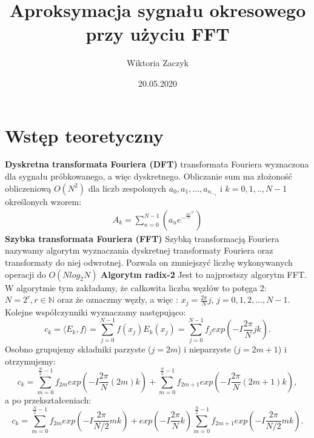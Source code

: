\documentclass{article}
\begin{document}
\title{Aproksymacja sygnału okresowego przy użyciu FFT}
\author{Wiktoria Zaczyk}
\date{20.05.2020}

\maketitle	

\section{Wstęp teoretyczny}
\textbf{Dyskretna transformata Fouriera (DFT)}
\newline
transformata Fouriera wyznaczona dla sygnału próbkowanego, a więc dyskretnego. Obliczanie sum ma złożoność obliczeniową $ O(N^2)$ dla liczb zespolonych $a_0,a_1,...,a_n_-_1$ i $k=0,1,..,N-1$ określonych wzorem:
\begin{equation}
\begin{array}{c}
A_k = \displaystyle \sum _{n=0}^{N-1}(a_ne^-^\frac{2\pi i}{N}^n^k) 
\end{array}
\end{equation}
\newline
\textbf{Szybka transformata Fouriera (FFT)}
\newline
Szybką transformacją Fouriera nazywamy algorytm wyznaczania dyskretnej transformaty Fouriera oraz transformaty do niej odwrotnej. Pozwala on zmniejszyć liczbę wykonywanych operacji do $O(N log_2N)$ 
\newline\newline
\textbf{Algorytm radix-2}
\newline
Jest to najprostszy algorytm FFT. W algorytmie tym zakładamy, że całkowita liczba węzłów to potęga 2: $N = 2^r, r \in \mathbb{N}$ oraz że oznaczmy węzły, a więc : $x_j = \frac{2\pi}{N} j$, $j = 0, 1, 2, . . . , N - 1$. Kolejne współczynniki wyznaczamy następująco:
\begin{equation}
c_k = \langle E_k, f \rangle = \displaystyle \sum_{j = 0}^{N-1} f(x_j)E_k(x_j) = \displaystyle \sum_{j = 0}^{N-1} f_j exp(-I\frac{2\pi}{N}jk).
\end{equation}
Osobno grupujemy składniki parzyste ($j= 2m$) i nieparzyste ($j = 2m+1$) i otrzymujemy:
\begin{equation}
c_k = \displaystyle \sum_{m = 0}^{\frac{N}{2}-1} f_{2m} exp(-I \frac{2\pi}{N}(2m)k) + \displaystyle \sum_{m = 0}^{\frac{N}{2}-1} f_{2m+1} exp(-I \frac{2\pi}{N}(2m+1)k),
\end{equation}
a po przekształceniach:
\begin{equation}
c_k = \displaystyle \sum_{m = 0}^{\frac{N}{2}-1} f_{2m} exp(-I \frac{2\pi}{N/2}mk) + exp(-I \frac{2\pi}{N}k) \displaystyle \sum_{m = 0}^{\frac{N}{2}-1} f_{2m+1} exp(-I \frac{2\pi}{N/2}mk).
\end{equation}
\end{document}
